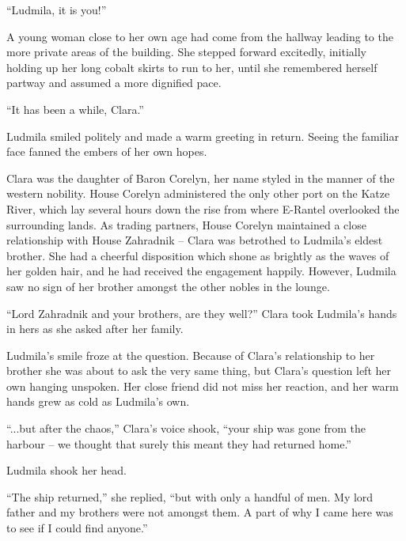  

“Ludmila, it is you!”

 

A young woman close to her own age had come from the hallway leading to the more private areas of the building. She stepped forward excitedly, initially holding up her long cobalt skirts to run to her, until she remembered herself partway and assumed a more dignified pace.

 

“It has been a while, Clara.”

 

Ludmila smiled politely and made a warm greeting in return. Seeing the familiar face fanned the embers of her own hopes.

 

Clara was the daughter of Baron Corelyn, her name styled in the manner of the western nobility. House Corelyn administered the only other port on the Katze River, which lay several hours down the rise from where E-Rantel overlooked the surrounding lands. As trading partners, House Corelyn maintained a close relationship with House Zahradnik – Clara was betrothed to Ludmila’s eldest brother. She had a cheerful disposition which shone as brightly as the waves of her golden hair, and he had received the engagement happily. However, Ludmila saw no sign of her brother amongst the other nobles in the lounge.

 

“Lord Zahradnik and your brothers, are they well?” Clara took Ludmila’s hands in hers as she asked after her family.

 

Ludmila’s smile froze at the question. Because of Clara’s relationship to her brother she was about to ask the very same thing, but Clara’s question left her own hanging unspoken. Her close friend did not miss her reaction, and her warm hands grew as cold as Ludmila’s own.

 

“...but after the chaos,” Clara’s voice shook, “your ship was gone from the harbour – we thought that surely this meant they had returned home.”

 

Ludmila shook her head.

 

“The ship returned,” she replied, “but with only a handful of men. My lord father and my brothers were not amongst them. A part of why I came here was to see if I could find anyone.”

